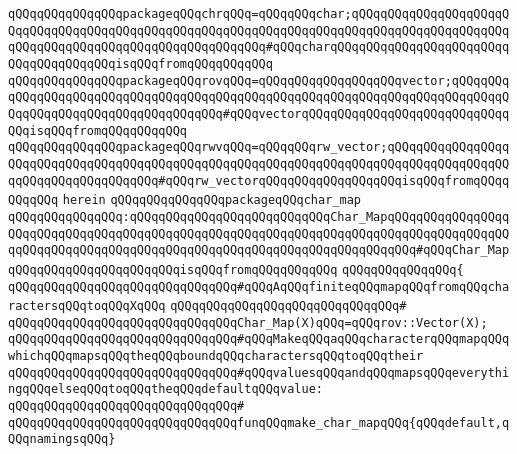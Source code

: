 \verb|qQQqqQQqqQQqqQQqpackageqQQqchrqQQq=qQQqqQQqchar;qQQqqQQqqQQqqQQqqQQqqQQqqQQqqQQqqQQqqQQqqQQqqQQqqQQqqQQqqQQqqQQqqQQqqQQqqQQqqQQqqQQqqQQqqQQqqQQqqQQqqQQqqQQqqQQqqQQqqQQqqQQqqQQq#qQQqcharqQQqqQQqqQQqqQQqqQQqqQQqqQQqqQQqqQQqqQQqisqQQqfromqQQqqQQqqQQq|\newline
\verb|qQQqqQQqqQQqqQQqpackageqQQqrovqQQq=qQQqqQQqqQQqqQQqqQQqvector;qQQqqQQqqQQqqQQqqQQqqQQqqQQqqQQqqQQqqQQqqQQqqQQqqQQqqQQqqQQqqQQqqQQqqQQqqQQqqQQqqQQqqQQqqQQqqQQqqQQqqQQqqQQq#qQQqvectorqQQqqQQqqQQqqQQqqQQqqQQqqQQqqQQqisqQQqfromqQQqqQQqqQQq|\newline
\verb|qQQqqQQqqQQqqQQqpackageqQQqrwvqQQq=qQQqqQQqrw_vector;qQQqqQQqqQQqqQQqqQQqqQQqqQQqqQQqqQQqqQQqqQQqqQQqqQQqqQQqqQQqqQQqqQQqqQQqqQQqqQQqqQQqqQQqqQQqqQQqqQQqqQQqqQQq#qQQqrw_vectorqQQqqQQqqQQqqQQqqQQqisqQQqfromqQQqqQQqqQQq|\newline
\verb|herein|\newline
\newline
\verb|qQQqqQQqqQQqqQQqpackageqQQqchar_map|\newline
\verb|qQQqqQQqqQQqqQQq:qQQqqQQqqQQqqQQqqQQqqQQqqQQqChar_MapqQQqqQQqqQQqqQQqqQQqqQQqqQQqqQQqqQQqqQQqqQQqqQQqqQQqqQQqqQQqqQQqqQQqqQQqqQQqqQQqqQQqqQQqqQQqqQQqqQQqqQQqqQQqqQQqqQQqqQQqqQQqqQQqqQQqqQQqqQQqqQQq#qQQqChar_MapqQQqqQQqqQQqqQQqqQQqqQQqisqQQqfromqQQqqQQqqQQq|\newline
\verb|qQQqqQQqqQQqqQQq{|\newline
\verb|qQQqqQQqqQQqqQQqqQQqqQQqqQQqqQQq#qQQqAqQQqfiniteqQQqmapqQQqfromqQQqcharactersqQQqtoqQQqXqQQq|\newline
\verb|qQQqqQQqqQQqqQQqqQQqqQQqqQQqqQQq#|\newline
\verb|qQQqqQQqqQQqqQQqqQQqqQQqqQQqqQQqChar_Map(X)qQQq=qQQqrov::Vector(X);|\newline
\newline
\verb|qQQqqQQqqQQqqQQqqQQqqQQqqQQqqQQq#qQQqMakeqQQqaqQQqcharacterqQQqmapqQQqwhichqQQqmapsqQQqtheqQQqboundqQQqcharactersqQQqtoqQQqtheir|\newline
\verb|qQQqqQQqqQQqqQQqqQQqqQQqqQQqqQQq#qQQqvaluesqQQqandqQQqmapsqQQqeverythingqQQqelseqQQqtoqQQqtheqQQqdefaultqQQqvalue:|\newline
\verb|qQQqqQQqqQQqqQQqqQQqqQQqqQQqqQQq#|\newline
\verb|qQQqqQQqqQQqqQQqqQQqqQQqqQQqqQQqfunqQQqmake_char_mapqQQq{qQQqdefault,qQQqnamingsqQQq}|\newline
